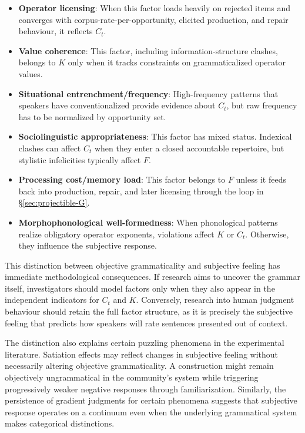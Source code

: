 \documentclass[12pt,letterpaper]{article}
\begin{document}
\begin{itemize}
\item \textbf{Operator licensing}: When this factor loads heavily on rejected items and converges with corpus-rate-per-opportunity, elicited production, and repair behaviour, it reflects $C_t$.
\item \textbf{Value coherence}: This factor, including information-structure clashes, belongs to $K$ only when it tracks constraints on grammaticalized operator values.
\item \textbf{Situational entrenchment/frequency}: High-frequency patterns that speakers have conventionalized provide evidence about $C_t$, but raw frequency has to be normalized by opportunity set.
\item \textbf{Sociolinguistic appropriateness}: This factor has mixed status. Indexical clashes can affect $C_t$ when they enter a closed accountable repertoire, but stylistic infelicities typically affect $F$.
\item \textbf{Processing cost/memory load}: This factor belongs to $F$ unless it feeds back into production, repair, and later licensing through the loop in \S\ref{sec:projectible-G}.
\item \textbf{Morphophonological well-formedness}: When phonological patterns realize obligatory operator exponents, violations affect $K$ or $C_t$. Otherwise, they influence the subjective response.
\end{itemize}

This distinction between objective grammaticality and subjective feeling has immediate methodological consequences. If research aims to uncover the grammar itself, investigators should model factors only when they also appear in the independent indicators for $C_t$ and $K$. Conversely, research into human judgment behaviour should retain the full factor structure, as it is precisely the subjective feeling that predicts how speakers will rate sentences presented out of context.

The distinction also explains certain puzzling phenomena in the experimental literature. Satiation effects may reflect changes in subjective feeling without necessarily altering objective grammaticality. A construction might remain objectively ungrammatical in the community's system while triggering progressively weaker negative responses through familiarization. Similarly, the persistence of gradient judgments for certain phenomena suggests that subjective response operates on a continuum even when the underlying grammatical system makes categorical distinctions.
\end{document}

